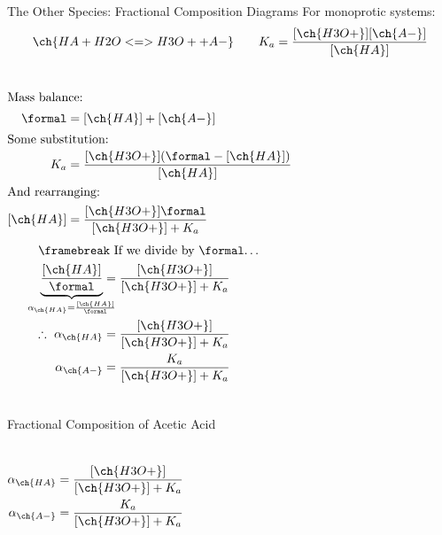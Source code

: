 \documentclass[handout]{beamer}
\begin{document}
\begin{frame}[t]{The Other Species: Fractional Composition Diagrams}
	For monoprotic systems: 
	\begin{align*}
		\ch{HA + H2O <=> H3O+ + A-} \qquad K_a =
		\frac{[\ch{H3O+}][\ch{A-}]}{[\ch{HA}]}
	\end{align*}
	\begin{columns}
	\begin{align*}
		\shortintertext{Mass balance:}
		\si{\formal} &= [\ch{HA}] + [\ch{A-}] \\
		\shortintertext{Some substitution:}
		K_a &= \frac{[\ch{H3O+}](\si{\formal} - [\ch{HA}])}{[\ch{HA}]}
		\\
		\shortintertext{And rearranging:}
		[\ch{HA}] &= \frac{[\ch{H3O+}]\si{\formal}}{[\ch{H3O+}] + K_a}
	\end{align*}
		\begin{align*}
		\shortintertext{\framebreak If we divide by \si{\formal}\ldots}
		\underbrace{\frac{[\ch{HA}]}{\si{\formal}}}_{\mathclap{\alpha_{\ch{HA}}
		= \frac{[\ch{HA}]}{\si{\formal}}}}%
		&= \frac{[\ch{H3O+}]}{[\ch{H3O+}] + K_a} \\
		\therefore~\alpha_{\ch{HA}} &= \frac{[\ch{H3O+}]}{[\ch{H3O+}] + K_a} \\
		\alpha_{\ch{A-}} &= \frac{K_a}{[\ch{H3O+}] + K_a}
	\end{align*}
\end{columns}
\end{frame}

\begin{frame}{Fractional Composition of Acetic Acid}
	\begin{columns}
		\begin{align*}
			\alpha_{\ch{HA}} &= \frac{[\ch{H3O+}]}{[\ch{H3O+}] +
			K_a} \\
			\alpha_{\ch{A-}} &= \frac{K_a}{[\ch{H3O+}] + K_a}
		\end{align*}
		\begin{center}
		
		\end{center}
	\end{columns}
\end{frame}

\clearpage
\end{document}
